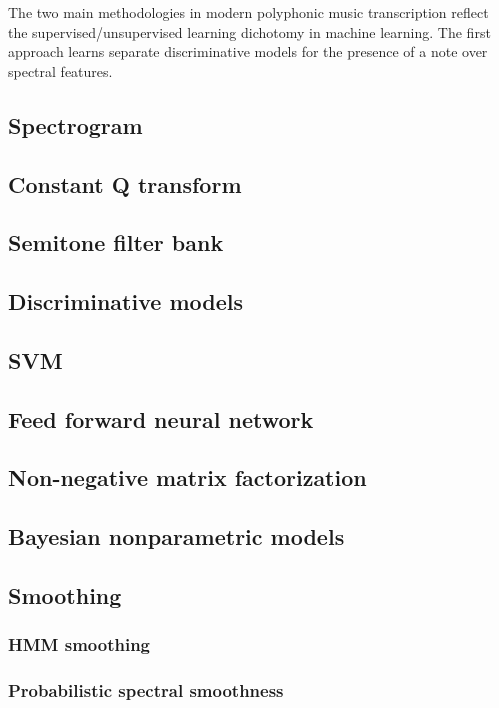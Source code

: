 \documentclass[5p]{elsarticle}
\begin{document}
The two main methodologies in modern polyphonic music transcription reflect the supervised/unsupervised learning dichotomy in machine learning. The first approach learns separate discriminative models for the presence of a note over spectral features.



\subsection{Spectrogram}
\subsection{Constant Q transform}
\subsection{Semitone filter bank}
\subsection{Discriminative models}
\subsection{SVM}
\subsection{Feed forward neural network}

\subsection{Non-negative matrix factorization}
\subsection{Bayesian nonparametric models}
\subsection{Smoothing}
\subsubsection{HMM smoothing}
\subsubsection{Probabilistic spectral smoothness}
\end{document}
